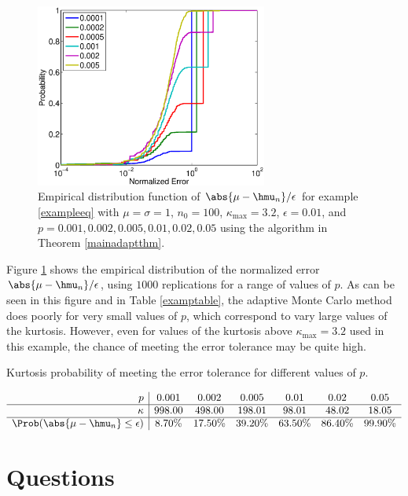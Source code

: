 \documentclass[12pt]{amsart}
\begin{document}
\begin{figure}
\includegraphics[width=3in]{NormalErrFig.eps}
\caption{Empirical distribution function of $\abs{\mu-\hmu_n}/\epsilon$ for example \eqref{exampleeq} with $\mu=\sigma=1$, $n_0=100$, $\kappa_{\max} = 3.2$, $\epsilon=0.01$, and  $p=0.001, 0.002, 0.005, 0.01, 0.02, 0.05$ using the algorithm in Theorem \ref{mainadaptthm}. \label{normalerrfig}}
\end{figure}

Figure \ref{normalerrfig} shows the empirical distribution of the normalized error $\abs{\mu-\hmu_n}/\epsilon$, using $1000$ replications for a range of values of $p$.  As can be seen in this figure and in Table \ref{examptable}, the adaptive Monte Carlo method does poorly for very small values of $p$, which correspond to vary large values of the kurtosis.  However, even for values of the kurtosis above $\kappa_{\max}=3.2$ used in this example, the chance of meeting the error tolerance may be quite high.

\begin{table}
\caption{Kurtosis probability of meeting the error tolerance for different values of $p$. \label{examptable}}
\[
\begin{array}{r|ccccccccccc}
p &   0.001 &    0.002 &    0.005 &     0.01 &     0.02 &     0.05 \\ 
\hline
\kappa &  998.00 &   498.00 &   198.01 &    98.01 &    48.02 &    18.05 \\ 
\hline
\Prob(\abs{\mu-\hmu_n} \le \epsilon) &    8.70\% &    17.50\% &    39.20\% &    63.50\% &    86.40\% &    99.90\% \\ 
\end{array}
\]
\end{table}


\section{Questions}
\end{document}
